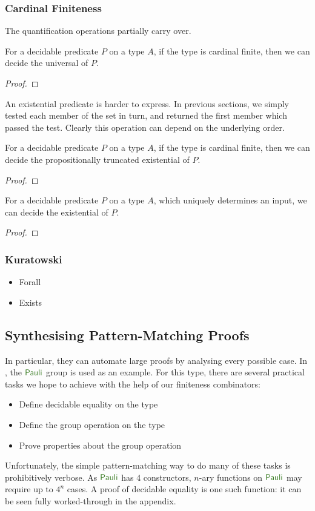 \subsubsection{Cardinal Finiteness}
The quantification operations partially carry over.
\begin{theorem}
  For a decidable predicate \(P\) on a type \(A\), if the type is cardinal
  finite, then we can decide the universal of \(P\).
\end{theorem}
\begin{proof}
\end{proof}

An existential predicate is harder to express.
In previous sections, we simply tested each member of the set in turn, and
returned the first member which passed the test.
Clearly this operation can depend on the underlying order.
\begin{theorem}
  For a decidable predicate \(P\) on a type \(A\), if the type is cardinal
  finite, then we can decide the propositionally truncated existential of \(P\).
\end{theorem}
\begin{proof}
\end{proof}
\begin{theorem}
  For a decidable predicate \(P\) on a type \(A\), which uniquely determines an
  input, we can decide the existential of \(P\).
\end{theorem}
\begin{proof}
\end{proof}
\subsubsection{Kuratowski}
\begin{itemize}
\item Forall
\item Exists
\end{itemize}

\subsection{Synthesising Pattern-Matching Proofs}
In particular, they can automate large proofs by analysing every possible case.
In \cite{firsovDependentlyTypedProgramming2015}, the \(\AgdaDatatype{Pauli}\)
group is used as an example.
For this type, there are several practical tasks we hope to achieve with the
help of our finiteness combinators:
\begin{itemize}
  \item Define decidable equality on the type
  \item Define the group operation on the type
  \item Prove properties about the group operation
\end{itemize}
Unfortunately, the simple pattern-matching way to do many of these tasks is
prohibitively verbose.
As \(\AgdaDatatype{Pauli}\) has 4 constructors, \(n\)-ary functions on
\(\AgdaDatatype{Pauli}\) may require up to \(4^n\) cases.
A proof of decidable equality is one such function: it can be seen fully
worked-through in the appendix.

